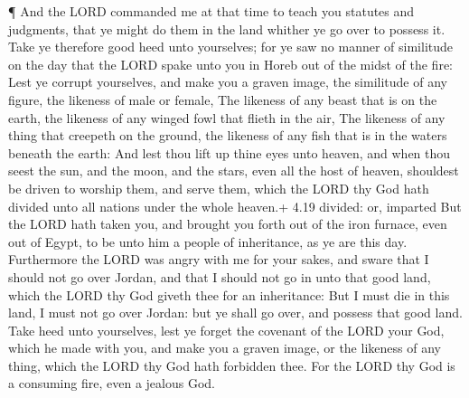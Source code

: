  ¶ And the LORD commanded me at that time to teach you
statutes and judgments, that ye might do them in the land whither ye go
over to possess it.  Take ye therefore good heed unto
yourselves; for ye saw no manner of similitude on the day that the LORD
spake unto you in Horeb out of the midst of the fire:  Lest
ye corrupt yourselves, and make you a graven image, the similitude of
any figure, the likeness of male or female,  The likeness
of any beast that is on the earth, the likeness of any winged fowl that
flieth in the air,  The likeness of any thing that creepeth
on the ground, the likeness of any fish that is in the waters beneath
the earth:  And lest thou lift up thine eyes unto heaven,
and when thou seest the sun, and the moon, and the stars, even all the
host of heaven, shouldest be driven to worship them, and serve them,
which the LORD thy God hath divided unto all nations under the whole
heaven.+ 4.19 divided: or, imparted  But the LORD hath
taken you, and brought you forth out of the iron furnace, even out of
Egypt, to be unto him a people of inheritance, as ye are this day.
 Furthermore the LORD was angry with me for your sakes, and
sware that I should not go over Jordan, and that I should not go in unto
that good land, which the LORD thy God giveth thee for an inheritance:
 But I must die in this land, I must not go over Jordan:
but ye shall go over, and possess that good land.  Take
heed unto yourselves, lest ye forget the covenant of the LORD your God,
which he made with you, and make you a graven image, or the likeness of
any thing, which the LORD thy God hath forbidden thee.  For
the LORD thy God is a consuming fire, even a jealous God.

